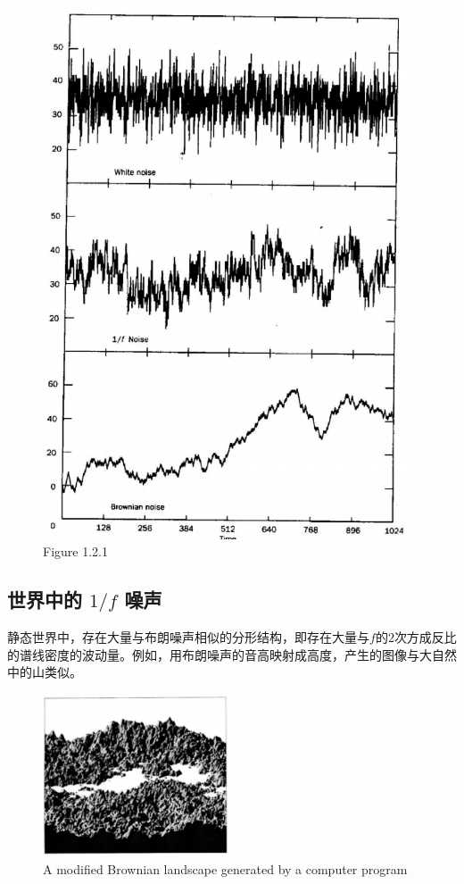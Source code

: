 \documentclass[11pt]{article}
\begin{document}
\begin{figure}[hptb]
	\centering
	\label{fig:1.2.1}
	\includegraphics[width=\textwidth]{pic/1.2.1.eps}
	\caption{Figure 1.2.1}
\end{figure}

\subsection{世界中的 $1/f$ 噪声}
静态世界中，存在大量与布朗噪声相似的分形结构，即存在大量与$f$的$2$次方成反比的谱线密度的波动量。例如，用布朗噪声的音高映射成高度，产生的图像与大自然中的山类似。

\begin{figure}[hptb]
	\centering
	\label{fig:1.2.2}
	\includegraphics[width=0.5\textwidth]{pic/1.2.2.eps}
	\caption{A modified Brownian landscape generated by a computer program}
\end{figure}
\end{document}
